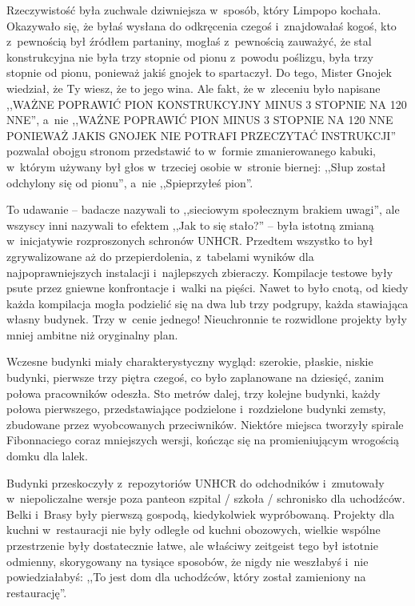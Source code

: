 \documentclass[oneside,polish,11pt,sfheadings]{mwbk}
\begin{document}
Rzeczywistość była zuchwale dziwniejsza w~sposób, który Limpopo kochała.
Okazywało się, że byłaś wysłana do odkręcenia czegoś i~znajdowałaś
kogoś, kto z~pewnością był źródłem partaniny, mogłaś z~pewnością
zauważyć, że stal konstrukcyjna nie była trzy stopnie od pionu z~powodu
poślizgu, była trzy stopnie od pionu, ponieważ jakiś gnojek to
spartaczył. Do tego, Mister Gnojek wiedział, że Ty wiesz, że to jego
wina. Ale fakt, że w~zleceniu było napisane ,,WAŻNE POPRAWIĆ PION
KONSTRUKCYJNY MINUS 3 STOPNIE NA 120 NNE'', a~nie ,,WAŻNE POPRAWIĆ PION
MINUS 3 STOPNIE NA 120 NNE PONIEWAŻ JAKIS GNOJEK NIE POTRAFI PRZECZYTAĆ
INSTRUKCJI'' pozwalał obojgu stronom przedstawić to w~formie
zmanierowanego kabuki, w~którym używany był głos w~trzeciej osobie w~stronie biernej: ,,Słup został odchylony się od pionu'', a~nie
,,Spieprzyłeś pion''.

To udawanie -- badacze nazywali to ,,sieciowym społecznym brakiem
uwagi'', ale wszyscy inni nazywali to efektem ,,Jak to się stało?'' -- była istotną zmianą w~inicjatywie rozproszonych schronów UNHCR. Przedtem
wszystko to był zgrywalizowane aż do przepierdolenia, z~tabelami wyników
dla najpoprawniejszych instalacji i~najlepszych zbieraczy. Kompilacje
testowe były psute przez gniewne konfrontacje i~walki na pięści. Nawet
to było cnotą, od kiedy każda kompilacja mogła podzielić się na dwa lub
trzy podgrupy, każda stawiająca własny budynek. Trzy w~cenie jednego!
Nieuchronnie te rozwidlone projekty były mniej ambitne niż oryginalny
plan.

Wczesne budynki miały charakterystyczny wygląd: szerokie, płaskie,
niskie budynki, pierwsze trzy piętra czegoś, co było zaplanowane na
dziesięć, zanim połowa pracowników odeszła. Sto metrów dalej, trzy
kolejne budynki, każdy połowa pierwszego, przedstawiające podzielone i~rozdzielone budynki zemsty, zbudowane przez wyobcowanych przeciwników.
Niektóre miejsca tworzyły spirale Fibonnaciego coraz mniejszych wersji,
kończąc się na promieniującym wrogością domku dla lalek.

Budynki przeskoczyły z~repozytoriów UNHCR do odchodników i~zmutowały w~niepoliczalne wersje poza panteon szpital / szkoła / schronisko dla
uchodźców. Belki i~Brasy były pierwszą gospodą, kiedykolwiek
wypróbowaną. Projekty dla kuchni w~restauracji nie były odległe od
kuchni obozowych, wielkie wspólne przestrzenie były dostatecznie łatwe,
ale właściwy zeitgeist tego był istotnie odmienny, skorygowany na
tysiące sposobów, że nigdy nie weszłabyś i~nie powiedziałabyś: ,,To jest
dom dla uchodźców, który został zamieniony na restaurację''.
\end{document}
